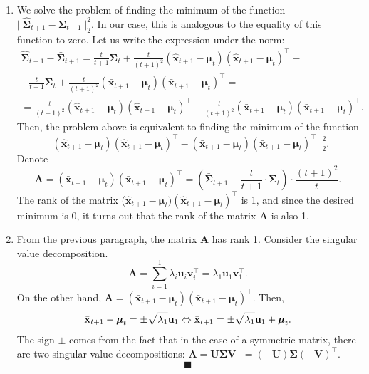 \documentclass[12pt]{article}
\begin{document}
{\begin{enumerate}
	\item We solve the problem of finding the minimum of the function $||\hat{\mathbf{\Sigma}}_{t+1} - \bar{\mathbf{\Sigma}}_{t+1}||_2^2$. In our case, this is analogous to the equality of this function to zero. Let us write the expression under the norm:
	\begin{gather*}
		\hat{\mathbf{\Sigma}}_{t+1} - \bar{\mathbf{\Sigma}}_{t+1} = \frac{t}{t+1}\mathbf{\Sigma}_t + \frac{t}{(t+1)^2}(\hat{\mathbf{x}}_{t+1}-\boldsymbol{\mu}_t)(\hat{\mathbf{x}}_{t+1}-\boldsymbol{\mu}_t)^\intercal -\\- \frac{t}{t+1}\mathbf{\Sigma}_t + \frac{t}{(t+1)^2}(\bar{\mathbf{x}}_{t+1}-\boldsymbol{\mu}_t)(\bar{\mathbf{x}}_{t+1}-\boldsymbol{\mu}_t)^\intercal =\\
		=\frac{t}{(t+1)^2}(\hat{\mathbf{x}}_{t+1}-\boldsymbol{\mu}_t)(\hat{\mathbf{x}}_{t+1}-\boldsymbol{\mu}_t)^\intercal -\frac{t}{(t+1)^2}(\bar{\mathbf{x}}_{t+1}-\boldsymbol{\mu}_t)(\bar{\mathbf{x}}_{t+1}-\boldsymbol{\mu}_t)^\intercal.
 	\end{gather*}
 	Then, the problem above is equivalent to finding the minimum of the function \[||(\hat{\mathbf{x}}_{t+1}-\boldsymbol{\mu}_t)(\hat{\mathbf{x}}_{t+1}-\boldsymbol{\mu}_t)^\intercal-(\bar{\mathbf{x}}_{t+1}-\boldsymbol{\mu}_t)(\bar{\mathbf{x}}_{t+1}-\boldsymbol{\mu}_t)^\intercal||_2^2.\]
 	Denote \[\mathbf{A} = (\bar{\mathbf{x}}_{t+1}-\boldsymbol{\mu}_t)(\bar{\mathbf{x}}_{t+1}-\boldsymbol{\mu}_t)^\intercal = \left(\bar{\mathbf{\Sigma}}_{t+1} - \frac{t}{t+1} \cdot \mathbf{\Sigma}_t \right) \cdot \frac{(t+1)^2}{t}.\]
 	The rank of the matrix ($\hat{\mathbf{x}}_{t+1}-\boldsymbol{\mu}_t)(\hat{\mathbf{x}}_{t+1}-\boldsymbol{\mu}_t)^\intercal$ is 1, and since the desired minimum is 0, it turns out that the rank of the matrix $\mathbf{A}$ is also 1.
 	
 	\item From the previous paragraph, the matrix $\mathbf{A}$ has rank 1. Consider the singular value decomposition. \[
 		\mathbf{A} = \sum_{i=1}^{1} \lambda_i \mathbf{u}_i \mathbf{v}_i^\intercal = \lambda_1 \mathbf{u}_1 \mathbf{v}_1^\intercal.
 	\]
 	On the other hand, $\mathbf{A} = (\bar{\mathbf{x}}_{t+1}-\boldsymbol{\mu}_t)(\bar{\mathbf{x}}_{t+1}-\boldsymbol{\mu}_t)^\intercal$. Then, \[
 	\bar{\mathbf{x}}_{t+1}-\boldsymbol{\mu}_t = \pm\sqrt{\lambda_1} \mathbf{u}_1 \Leftrightarrow\\
 	\bar{\mathbf{x}}_{t+1} = \pm\sqrt{\lambda_1} \mathbf{u}_1 + \boldsymbol{\mu}_t.
 	\]
 	The sign $\pm$ comes from the fact that in the case of a symmetric matrix, there are two singular value decompositions: $\mathbf{A}=\mathbf{U}\mathbf{\Sigma} \mathbf{V}^\intercal=(-\mathbf{U})\mathbf{\Sigma} (-\mathbf{V})^\intercal$.
 	$$ \blacksquare $$
\end{enumerate}

}
\end{document}
